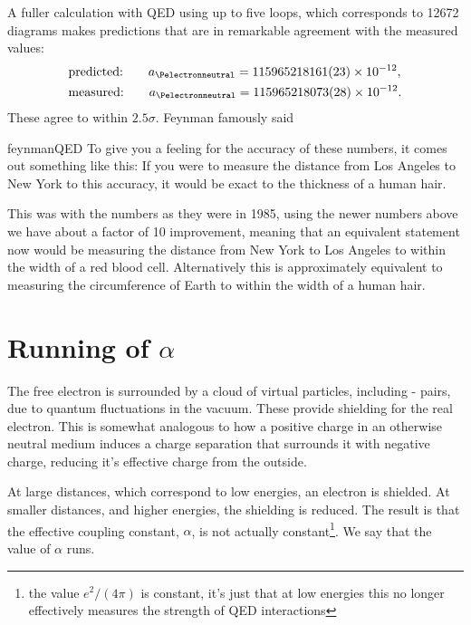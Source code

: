 \documentclass[fleqn]{NotesClass}
\begin{document}
    A fuller calculation with QED using up to five loops, which corresponds to 12672 diagrams makes predictions that are in remarkable agreement with the measured values:
    \begin{alignat}{3}
        &\text{predicted:}\qquad a_{\Pelectronneutral} = 115965218161(23) \times 10^{-12},\\
        &\text{measured:}\qquad a_{\Pelectronneutral} = 115965218073(28) \times 10^{-12}.
    \end{alignat}
    These agree to within \(2.5\sigma\).
    Feynman famously said
    \begin{displaycquote}{feynmanQED}
        To give you a feeling for the accuracy of these numbers, it comes out something like this: If you were to measure the distance from Los Angeles to New York to this accuracy, it would be exact to the thickness of a human hair.
    \end{displaycquote}
    This was with the numbers as they were in 1985, using the newer numbers above we have about a factor of 10 improvement, meaning that an equivalent statement now would be measuring the distance from New York to Los Angeles to within the width of a red blood cell.
    Alternatively this is approximately equivalent to measuring the circumference of Earth to within the width of a human hair.
    
    
    \section{Running of \texorpdfstring{\(\alpha\)}{alpha}}\label{sec:running of alpha}
    The free electron is surrounded by a cloud of virtual particles, including \Pe-\APe{} pairs, due to quantum fluctuations in the vacuum.
    These provide shielding for the real electron.
    This is somewhat analogous to how a positive charge in an otherwise neutral medium induces a charge separation that surrounds it with negative charge, reducing it's effective charge from the outside.
    
    At large distances, which correspond to low energies, an electron is shielded.
    At smaller distances, and higher energies, the shielding is reduced.
    The result is that the effective coupling constant, \(\alpha\), is not actually constant\footnote{the value \(e^2/(4\pi)\) is constant, it's just that at low energies this no longer effectively measures the strength of QED interactions}.
    We say that the value of \(\alpha\) runs.
    
\end{document}
